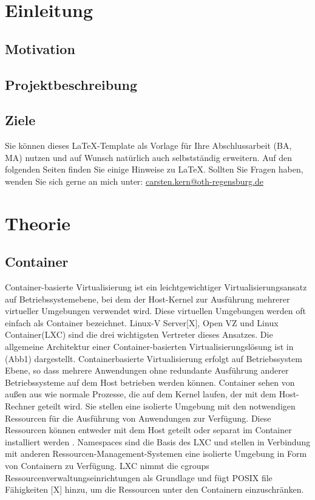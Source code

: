 \documentclass[12pt,a4paper,bibliography=totocnumbered,listof=totocnumbered]{scrartcl}
\begin{document}
\section{Einleitung}
\subsection{Motivation}
\subsection{Projektbeschreibung}
\subsection{Ziele}
Sie können dieses \LaTeX-Template als Vorlage für Ihre Abschlussarbeit (\ac{BA}, \ac{MA}) nutzen und auf Wunsch natürlich auch selbstständig erweitern. Auf den folgenden Seiten finden Sie einige Hinweise zu \LaTeX. Sollten Sie Fragen haben, wenden Sie sich gerne an mich unter: \url{carsten.kern@oth-regensburg.de} 



\pagebreak
\section{Theorie}
\subsection{Container}
Container-basierte Virtualisierung ist ein leichtgewichtiger Virtualisierungsansatz auf Betriebssystemebene, bei dem der Host-Kernel zur Ausführung mehrerer virtueller Umgebungen verwendet wird. Diese virtuellen Umgebungen werden oft einfach als \glqq Container \grqq{} bezeichnet. Linux-V Server[X], Open VZ\cite{IndexOpenvz.org} und Linux Container(LXC)\cite{IndexLinuxcontainers.Org} sind die drei wichtigsten Vertreter dieses Ansatzes. Die allgemeine Architektur einer Container-basierten Virtualisierungslösung ist in (Abb1) dargestellt. Containerbasierte Virtualisierung erfolgt auf Betriebssystem Ebene, so dass mehrere Anwendungen ohne redundante Ausführung anderer Betriebssysteme auf dem Host betrieben werden können. Container sehen von außen aus wie normale Prozesse, die auf dem Kernel laufen, der mit dem Host-Rechner geteilt wird. Sie stellen eine isolierte Umgebung mit den notwendigen Ressourcen für die Ausführung von Anwendungen zur Verfügung. Diese Ressourcen können entweder mit dem Host geteilt oder separat im Container installiert werden \cite{Xavier2014AClusters}. Namespaces sind die Basis des LXC und stellen in Verbindung mit anderen Ressourcen-Management-Systemen eine isolierte Umgebung in Form von Containern zu Verfügung. LXC nimmt die cgroups Ressourcenverwaltungseinrichtungen\cite{ControlDocumentation} als Grundlage und fügt POSIX file Fähigkeiten [X] hinzu, um die Ressourcen unter den Containern einzuschränken. 
\end{document}
